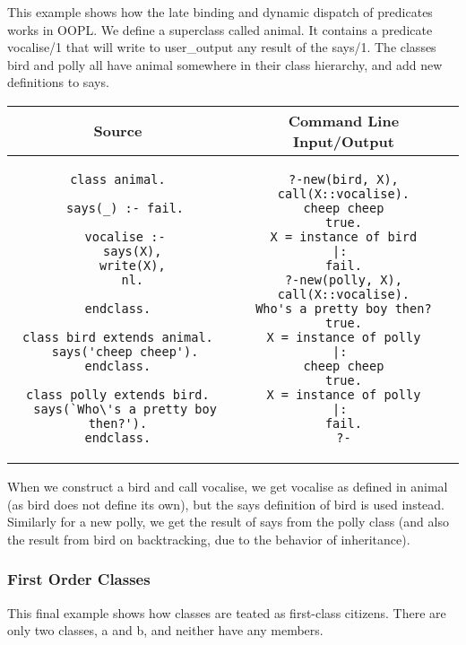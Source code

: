 \documentclass[12pt,a4paper,twoside,openright]{report}
\begin{document}
This example shows how the late binding and dynamic dispatch of predicates works in OOPL. We define a superclass called animal. It contains a predicate vocalise/1 that will write to user_output any result of the says/1. The classes bird and polly all have animal somewhere in their class hierarchy, and add new definitions to says.

\begin{center}
\begin{tabular}{c|c}
Source & Command Line Input/Output \\
\hline
	\small
\begin{lstlisting}
class animal.
  
  says(_) :- fail.

  vocalise :-
    says(X),
    write(X),
    nl.
    
endclass.

class bird extends animal.
  says('cheep cheep').
endclass.

class polly extends bird.
  says(`Who\'s a pretty boy then?').
endclass.
\end{lstlisting}
&
	\small
\begin{lstlisting}
?-new(bird, X), call(X::vocalise).
cheep cheep
true.
X = instance of bird
|: 
fail.
?-new(polly, X), call(X::vocalise).
Who's a pretty boy then?
true.
X = instance of polly
|: 
cheep cheep
true.
X = instance of polly
|: 
fail.
?-
\end{lstlisting}
\\
\end{tabular}
\end{center}

When we construct a bird and call vocalise, we get vocalise as defined in animal (as bird does not define its own), but the says definition of bird is used instead. Similarly for a new polly, we get the result of says from the polly class (and also the result from bird on backtracking, due to the behavior of inheritance). 

	\subsubsection{First Order Classes}
	
This final example shows how classes are teated as first-class citizens. There are only two classes, a and b, and neither have any members.
\end{document}
